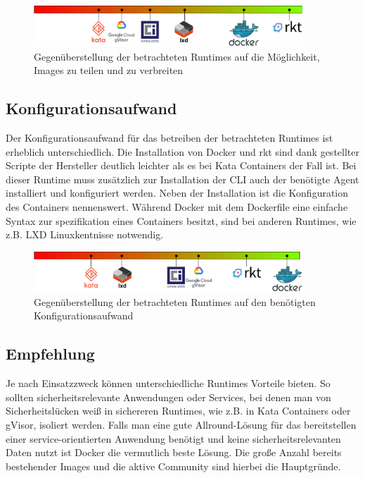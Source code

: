 \begin{figure}[h]
	\begin{center}
		\includegraphics[width=0.9\textwidth]{bilder/rating-share.pdf}
		\caption{Gegenüberstellung der betrachteten Runtimes auf die Möglichkeit, Images zu teilen und zu verbreiten}
		\label{fig:compFazitShare}
	\end{center}
\end{figure}

\subsection{Konfigurationsaufwand}
\label{sec:compFazitConfig}

Der Konfigurationsaufwand für das betreiben der betrachteten Runtimes ist erheblich unterschiedlich. Die Installation von Docker und rkt sind dank gestellter Scripte der Hersteller deutlich leichter als es bei Kata Containers der Fall ist. Bei dieser Runtime muss zusätzlich zur Installation der CLI auch der benötigte Agent installiert und konfiguriert werden. Neben der Installation ist die Konfiguration des Containers nennenswert. Während Docker mit dem Dockerfile eine einfache Syntax zur spezifikation eines Containers besitzt, sind bei anderen Runtimes, wie z.B. LXD Linuxkentnisse notwendig. 

\begin{figure}[h]
	\begin{center}
		\includegraphics[width=0.9\textwidth]{bilder/rating-config.pdf}
		\caption{Gegenüberstellung der betrachteten Runtimes auf den benötigten Konfigurationsaufwand}
		\label{fig:comFazitConfig}
	\end{center}
\end{figure}

\subsection{Empfehlung}
\label{sec:compFazitEmpfehlung}

Je nach Einsatzzweck können unterschiedliche Runtimes Vorteile bieten. So sollten sicherheitsrelevante Anwendungen oder Services, bei denen man von Sicherheitslücken weiß in sichereren Runtimes, wie z.B. in Kata Containers oder gVisor, isoliert werden. Falls man eine gute Allround-Lösung für das bereitstellen einer service-orientierten Anwendung benötigt und keine sicherheitsrelevanten Daten nutzt ist Docker die vermutlich beste Lösung. Die große Anzahl bereits bestehender Images und die aktive Community sind hierbei die Hauptgründe.
